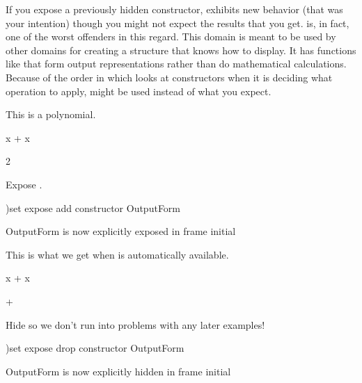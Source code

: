 If you expose a previously hidden constructor, \Language{}
exhibits new behavior (that was your intention) though you might not
expect the results that you get.
 is, in fact, one of the worst offenders in this
regard.
This domain is meant to be used by other domains for creating a
structure that \Language{} knows how to display.
It has functions like  that form output
representations rather than do mathematical calculations.
Because of the order in which \Language{} looks at constructors
when it is deciding what operation to apply, 
might be used instead of what you expect.
\begin{xtc}
\begin{xtccomment}
This is a polynomial.
\end{xtccomment}
\begin{spadsrc}
x + x
\end{spadsrc}
\begin{TeXOutput}
\begin{fricasmath}{1}
2\TIMES {}%
\end{fricasmath}
\end{TeXOutput}
\end{xtc}
\begin{xtc}
\begin{xtccomment}
Expose .
\end{xtccomment}
\begin{spadsrc}
)set expose add constructor OutputForm 
\end{spadsrc}
\begin{SysCmdOutput}
   OutputForm is now explicitly exposed in frame initial 
\end{SysCmdOutput}
\end{xtc}
\begin{xtc}
\begin{xtccomment}
This is what we get when  is automatically
available.
\end{xtccomment}
\begin{spadsrc}
x + x 
\end{spadsrc}
\begin{TeXOutput}
\begin{fricasmath}{2}
+%
\end{fricasmath}
\end{TeXOutput}
\end{xtc}
\begin{xtc}
\begin{xtccomment}
Hide  so we don't run into problems
with any later examples!
\end{xtccomment}
\begin{spadsrc}
)set expose drop constructor OutputForm 
\end{spadsrc}
\begin{SysCmdOutput}
   OutputForm is now explicitly hidden in frame initial 
\end{SysCmdOutput}
\end{xtc}

